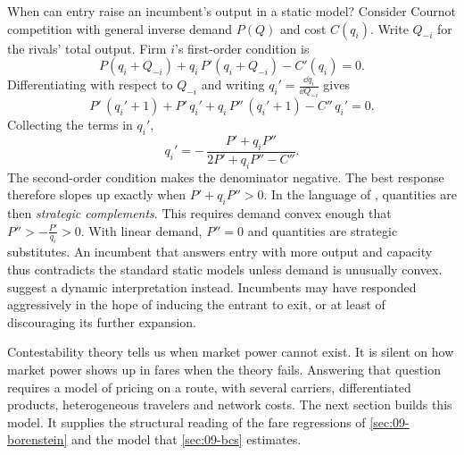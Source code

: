When can entry raise an incumbent's output in a static model? Consider Cournot competition with general inverse
demand $P(Q)$ and cost $C(q_i)$. Write $Q_{-i}$ for the rivals' total output. Firm $i$'s first-order condition is
\begin{equation*}
  P(q_i + Q_{-i}) + q_i\,P'(q_i + Q_{-i}) - C'(q_i) = 0 .
\end{equation*}
Differentiating with respect to $Q_{-i}$ and writing $q_i' = \frac{\dd q_i}{\dd Q_{-i}}$ gives
\begin{equation*}
  P'\,(q_i' + 1) + P'\,q_i' + q_i\,P''\,(q_i' + 1) - C''\,q_i' = 0 .
\end{equation*}
Collecting the terms in $q_i'$,
\begin{equation}\label{eq:09-br-slope}
  q_i' = -\,\frac{P' + q_i P''}{2P' + q_i P'' - C''} .
\end{equation}
The second-order condition makes the denominator negative. The best response therefore slopes up exactly when
$P' + q_i P'' > 0$. In the language of \citet{BulowGeanakoplosKlemperer1985}, quantities are then
\emph{strategic complements}. This requires demand convex enough that $P'' > -\frac{P'}{q_i} > 0$. With linear
demand, $P'' = 0$ and quantities are strategic substitutes. An incumbent that answers entry with more output
and capacity thus contradicts the standard static models unless demand is unusually convex.
\citet[p.~460]{WhinstonCollins1992} suggest a dynamic interpretation instead. Incumbents may have responded
aggressively in the hope of inducing the entrant to exit, or at least of discouraging its further expansion.

Contestability theory tells us when market power cannot exist. It is silent on how market power shows up
in fares when the theory fails. Answering that question requires a model of pricing on a route, with
several carriers, differentiated products, heterogeneous travelers and network costs. The next section
builds this model. It supplies the structural reading of the fare regressions of \cref{sec:09-borenstein}
and the model that \cref{sec:09-bcs} estimates.
